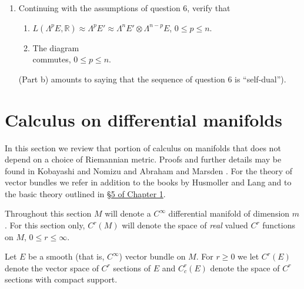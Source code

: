 \begin{enumerate}
\[\]
is exact (Hint: Choose an orthonormal basis for $E$ such that $\phi$ is an element of the dual orthonormal basis for $E'$).
\item Continuing with the assumptions of question 6, verify that
\begin{enumerate}[label=\alph*)]
\item $L(\Lambda^p E,\mathbb R)\approx\Lambda^p E'\approx\Lambda^n E'\otimes\Lambda^{n-p}E$, $0\leq p\leq n$.
\item The diagram
\[

\]
commutes, $0\leq p\leq n$.
\end{enumerate}
(Part b) amounts to saying that the sequence of question 6 is ``self-dual'').
\end{enumerate}
\section{Calculus on differential manifolds}\label{sec:5:2}
In this section we review that portion of calculus on manifolds that does not depend on a choice of Riemannian metric. Proofs and further details may be found in Kobayashi and Nomizu \cite{bib:II:kobayashi-s-and-nomizu-k:1} and Abraham and Marsden \cite{bib:II:abraham-r-and-marsden-j-e:1}. For the theory of vector bundles we refer in addition to the books by Husmoller \cite{bib:II:husmoller-d:1} and Lang \cite{bib:II:lang-s:1} and to the basic theory outlined in \hyperref[sec:1:5]{\S5 of Chapter 1}.

Throughout this section $M$ will denote a $C^\infty$ differential manifold of dimension $m$. For this section only, $C^r(M)$ will denote the space of \emph{real} valued $C^r$ functions on $M$, $0\leq r\leq\infty$.

Let $E$ be a smooth (that is, $C^\infty$) vector bundle on $M$. For $r\geq0$ we let $C^r(E)$ denote the vector space of $C^r$ sections of $E$ and $C_c^r(E)$ denote the space of $C^r$ sections with compact support.
